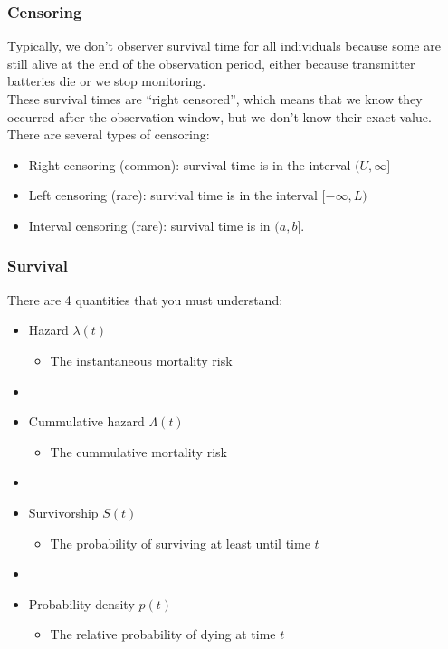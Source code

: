\documentclass[color=usenames,dvipsnames]{beamer}\usepackage[]{graphicx}\usepackage[]{color}
\begin{document}
\begin{frame}
  \frametitle{Censoring}
  Typically, we don't observer survival time for all individuals
  because some are still alive at the end of the observation period,
  either because transmitter batteries die or we stop monitoring. \\
  \pause
  \vfill
  These survival times are ``right censored'', which means that we
  know they occurred after the observation window, but we don't know
  their exact value. \\
  \pause
  \vfill
  There are several types of censoring: 
  \begin{itemize}%
    \small
    \item Right censoring (common): survival time is in the interval $(U,\infty]$
    \item Left censoring (rare): survival time is in the interval
      $[-\infty,L)$
    \item Interval censoring (rare): survival time is in $(a,b]$. 
  \end{itemize}  
\end{frame}





\begin{frame}
  \frametitle{Survival}
  \large
  There are 4 quantities that you must understand:
  \vfill
  \begin{itemize}%
    \item<1-> Hazard $\lambda(t)$
      \begin{itemize}
        \item The instantaneous mortality risk
      \end{itemize}
    \item[]
    \item<2-> Cummulative hazard $\Lambda(t)$
      \begin{itemize}
        \item The cummulative mortality risk
      \end{itemize}
    \item[]
    \item<3-> Survivorship $S(t)$
      \begin{itemize}
        \item The probability of surviving at least until time $t$
      \end{itemize}
    \item[]
    \item<4-> Probability density $p(t)$
      \begin{itemize}
        \item The relative probability of dying at time $t$
      \end{itemize}
  \end{itemize}
\end{frame}
\end{document}
